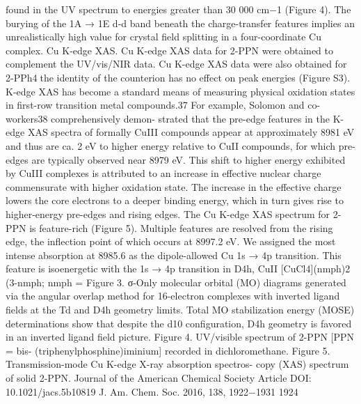 found in the UV spectrum to energies greater than 30 000 cm−1
(Figure 4). The burying of the 1A → 1E d-d band beneath the
charge-transfer features implies an unrealistically high value for
crystal ﬁeld splitting in a four-coordinate Cu complex.
Cu K-edge XAS. Cu K-edge XAS data for 2-PPN were
obtained to complement the UV/vis/NIR data. Cu K-edge
XAS data were also obtained for 2-PPh4the identity of the
counterion has no eﬀect on peak energies (Figure S3). K-edge
XAS has become a standard means of measuring physical
oxidation states in ﬁrst-row transition metal compounds.37 For
example, Solomon and co-workers38 comprehensively demon-
strated that the pre-edge features in the K-edge XAS spectra of
formally CuIII compounds appear at approximately 8981 eV and
thus are ca. 2 eV to higher energy relative to CuII compounds,
for which pre-edges are typically observed near 8979 eV. This
shift to higher energy exhibited by CuIII complexes is attributed
to an increase in eﬀective nuclear charge commensurate with
higher oxidation state. The increase in the eﬀective charge
lowers the core electrons to a deeper binding energy, which in
turn gives rise to higher-energy pre-edges and rising edges.
The Cu K-edge XAS spectrum for 2-PPN is feature-rich
(Figure 5). Multiple features are resolved from the rising edge,
the inﬂection point of which occurs at 8997.2 eV. We assigned
the most intense absorption at 8985.6 as the dipole-allowed Cu
1s → 4p transition. This feature is isoenergetic with the 1s →
4p transition in D4h, CuII [CuCl4](nmph)2 (3-nmph; nmph =
Figure 3. σ-Only molecular orbital (MO) diagrams generated via the
angular overlap method for 16-electron complexes with inverted ligand
ﬁelds at the Td and D4h geometry limits. Total MO stabilization energy
(MOSE) determinations show that despite the d10 conﬁguration, D4h
geometry is favored in an inverted ligand ﬁeld picture.
Figure 4. UV/visible spectrum of 2-PPN [PPN = bis-
(triphenylphosphine)iminium] recorded in dichloromethane.
Figure 5. Transmission-mode Cu K-edge X-ray absorption spectros-
copy (XAS) spectrum of solid 2-PPN.
Journal of the American Chemical Society
Article
DOI: 10.1021/jacs.5b10819
J. Am. Chem. Soc. 2016, 138, 1922−1931
1924



